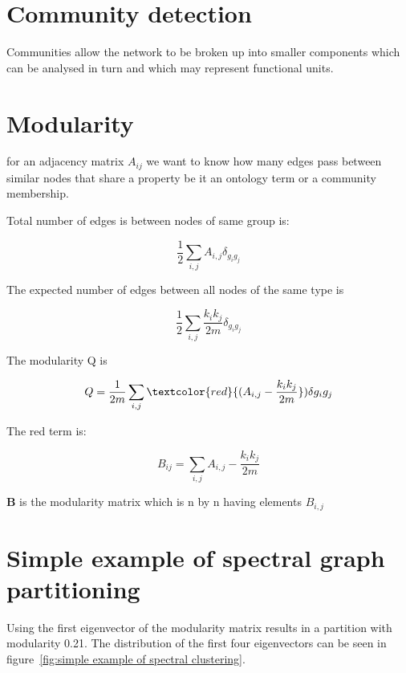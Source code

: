 \section{Community detection}

Communities allow the network to be broken up into smaller components which can be analysed in turn and which may represent functional units.


\section{Modularity}
\label{sec:modularity definition}

for an adjacency matrix $A_{ij}$ we want to know how many edges pass between similar nodes that share a property be it an ontology term or a community membership.

Total number of edges is between nodes of same group is:

\begin{equation}
\label{eq:notes_modularity_totaledges}
    \frac{1}{2} \sum_{i,j} A_{i,j}\delta_{g_i g_j}
\end{equation}

The expected number of edges between all nodes of the same type is 

\begin{equation}
    \frac{1}{2}\sum_{i,j} \frac{k_i k_j}{2m}\delta_{g_i g_j}
\end{equation}

The modularity Q is 

\begin{equation}
    Q=\frac{1}{2m}\sum_{i,j}\textcolor{red}{(A_{i,j}-\frac{k_i k_j}{2m}}) \delta{g_i g_j}
\end{equation}

The red term is:

\begin{equation}
    B_{ij} = \sum_{i,j} A_{i,j} - \frac{k_i k_j}{2m}
\end{equation}

$\mathbf{B}$ is the modularity matrix which is n by n having elements $B_{i,j}$

\section{Simple example of spectral graph partitioning}
\label{sec:simple example of spectral graph partitioning}

Using the first eigenvector of the modularity matrix results in a partition with modularity 0.21. The distribution of the first four eigenvectors can be seen in figure~\ref{fig:simple example of spectral clustering}.

